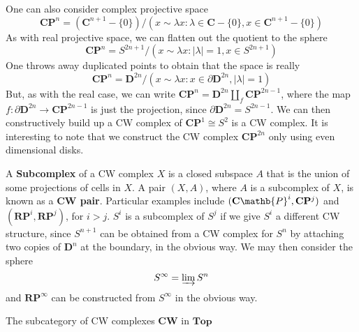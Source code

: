 \begin{example}
    One can also consider complex projective space
    \[ \mathbf{C} \mathbf{P}^n = (\mathbf{C}^{n+1} - \{ 0 \}) / {(x \sim \lambda x : \lambda \in \mathbf{C} - \{ 0 \}, x \in \mathbf{C}^{n+1} - \{ 0 \})} \]
    As with real projective space, we can flatten out the quotient to the sphere
    \[ \mathbf{C} \mathbf{P}^n = S^{2n + 1} / {(x \sim \lambda x : |\lambda| = 1, x \in S^{2n + 1})} \]
    One throws away duplicated points to obtain that the space is really
    \[ \mathbf{C} \mathbf{P}^n = \mathbf{D}^{2n} / {(x \sim \lambda x : x \in \partial \mathbf{D}^{2n}, |\lambda| = 1)} \]
    But, as with the real case, we can write $\mathbf{C} \mathbf{P}^n = \mathbf{D}^{2n} \coprod_f \mathbf{C} \mathbf{P}^{2n - 1}$, where the map $f: \partial \mathbf{D}^{2n} \to \mathbf{C} \mathbf{P}^{2n-1}$ is just the projection, since $\partial \mathbf{D}^{2n} = S^{2n-1}$. We can then constructively build up a CW complex of $\mathbf{C} \mathbf{P}^1 \cong S^2$ is a CW complex. It is interesting to note that we construct the CW complex $\mathbf{C} \mathbf{P}^{2n}$ only using even dimensional disks.
\end{example}

A {\bf Subcomplex} of a CW complex $X$ is a closed subspace $A$ that is the union of some projections of cells in $X$. A pair $(X,A)$, where $A$ is a subcomplex of $X$, is known as a {\bf CW pair}. Particular examples include $(\mathbf{C} \mathb{P}^i, \mathbf{C} \mathbf{P}^j)$ and $(\mathbf{R} \mathbf{P}^i, \mathbf{R} \mathbf{P}^j)$, for $i > j$. $S^i$ is a subcomplex of $S^j$ if we give $S^i$ a different CW structure, since $S^{n+1}$ can be obtained from a CW complex for $S^n$ by attaching two copies of $\mathbf{D}^n$ at the boundary, in the obvious way. We may then consider the sphere
%
\[ S^\infty = \varinjlim S^n \]
%
and $\mathbf{R} \mathbf{P}^\infty$ can be constructed from $S^\infty$ in the obvious way.

The subcategory of CW complexes $\textbf{CW}$ in $\textbf{Top}$

